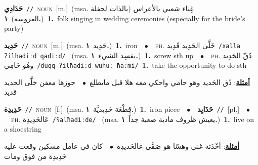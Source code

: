 \documentclass[10pt,a4paper,twoside]{article} %
\begin{document}
\begin{multicols}{2}
{\setlength\topsep{0pt}\textbf{\foreignlanguage{arabic}{حَدَادِي}}\ {\color{gray}\texttt{//}\color{black}}\ \textsc{noun}\ [m.]\ \color{gray}(msa. \foreignlanguage{arabic}{غِناء شعبي بالأعراس (بالذات لحفلة العروسة)}~\foreignlanguage{arabic}{\textbf{١.}})\color{black}\ \textbf{1.}~folk singing in wedding ceremonies (especially for the bride's party)\ } \vspace{2mm}

{\setlength\topsep{0pt}\textbf{\foreignlanguage{arabic}{حَدِيد}}\ {\color{gray}\texttt{//}\color{black}}\ \textsc{noun}\ [m.]\ \color{gray}(msa. \foreignlanguage{arabic}{حَدِيد}~\foreignlanguage{arabic}{\textbf{١.}})\color{black}\ \textbf{1.}~iron\ \ $\bullet$\ \ \textsc{ph.} \color{gray} \foreignlanguage{arabic}{خَلَّى الحَدِيد قَدِيد}\color{black}\ {\color{gray}\texttt{/{\sffamily xalla ʔilħadiːd qadiːd}/}\color{black}}\ \color{gray} (msa. \foreignlanguage{arabic}{يفسِد الشيء}~\foreignlanguage{arabic}{\textbf{١.}})\color{black}\ \textbf{1.}~screw sth up\ \ $\bullet$\ \ \textsc{ph.} \color{gray} \foreignlanguage{arabic}{دُقّ الحَدِيد وهُو حَامِي}\color{black}\ {\color{gray}\texttt{/{\sffamily duqq ʔilħadiːd wuhuː ħaːmi}/}\color{black}}\ \textbf{1.}~take the opportunity to do sth\  \begin{flushright}\color{gray}\foreignlanguage{arabic}{\textbf{\underline{\foreignlanguage{arabic}{أمثلة}}}: دُق الحَديد وهو حامي واحكي معه هلا قبل مايطلع\ $\bullet$\ \  جوزها معفن خلَّى الحديد قديد}\end{flushright}\color{black}} \vspace{2mm}

{\setlength\topsep{0pt}\textbf{\foreignlanguage{arabic}{حَدِيدِة}}\ {\color{gray}\texttt{//}\color{black}}\ \textsc{noun}\ [f.]\ \color{gray}(msa. \foreignlanguage{arabic}{قِطْعَة حَدِيديَّة}~\foreignlanguage{arabic}{\textbf{١.}})\color{black}\ \textbf{1.}~iron piece\ \ $\bullet$\ \ \setlength\topsep{0pt}\textbf{\foreignlanguage{arabic}{حَدَايِد}}\ {\color{gray}\texttt{//}\color{black}}\ [pl.]\ \ $\bullet$\ \ \textsc{ph.} \color{gray} \foreignlanguage{arabic}{عَالحَدِيدِة}\color{black}\ {\color{gray}\texttt{/{\sffamily ʕalħadiːde}/}\color{black}}\ \color{gray} (msa. \foreignlanguage{arabic}{يعيش ظروف مادية صعبة جداً}~\foreignlanguage{arabic}{\textbf{١.}})\color{black}\ \textbf{1.}~live on a shoestring\  \begin{flushright}\color{gray}\foreignlanguage{arabic}{\textbf{\underline{\foreignlanguage{arabic}{أمثلة}}}: أخْدَته غني وهسّا هو صَفَّى عالحَديدِة\ $\bullet$\ \  كان في عامل مسكين وقعت عليه حَدِيدِة من فوق ومات}\end{flushright}\color{black}} \vspace{2mm}


\end{multicols}
\end{document}
